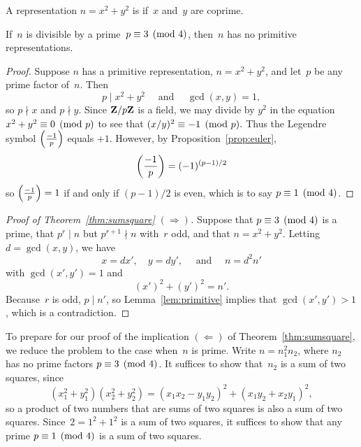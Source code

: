 \begin{definition}[Primitive]
A representation $n=x^2 + y^2$ is 
if~$x$ and~$y$ are coprime.
\end{definition}

\begin{lemma}\label{lem:primitive}
If~$n$ is divisible by a prime~$p\equiv 3\pmod{4}$, then~$n$
has no primitive representations.
\end{lemma}
\begin{proof}
Suppose $n$ has a primitive representation, $n=x^2 + y^2$, and
let~$p$ be any prime factor of~$n$.  Then
$$
   p \mid x^2 + y^2\quad \text{ and }\quad \gcd(x,y)=1,
$$
so $p\nmid x$ and $p\nmid y$.
Since $\mathbf{Z}/p\mathbf{Z}{}$ is a field, we may divide by $y^2$ in the equation
$x^2 + y^2 \equiv 0\pmod{p}$ to see that
$
  (x/y)^2 \equiv -1\pmod{p}.
$
Thus the Legendre symbol $\left(\frac{-1}{p}\right)$ equals $+1$.
However, by Proposition~\ref{prop:euler},
$$
   \left(\frac{-1}{p}\right) = (-1)^{(p-1)/2}
$$
so $\left(\frac{-1}{p}\right)=1$ if and only if $(p-1)/2$ is even, which is
to say $p\equiv 1\pmod{4}$.
\end{proof}

\begin{proof}[Proof of Theorem~\ref{thm:sumsquare}
  $\left(\Longrightarrow\right)$]
  Suppose that $p\equiv 3\pmod{4}$ is a prime, that
  $p^r\mid n$ but $p^{r+1}\nmid n$ with~$r$ odd, and that
  $n=x^2+y^2$.  Letting $d=\gcd(x,y)$, we have
  $$
  x = dx', \quad y = dy', \quad\text{ and }\quad n = d^2 n'
  $$
  with $\gcd(x',y')=1$ and
  $$
  (x')^2 + (y')^2 = n'.
  $$
  Because~$r$ is odd, $p\mid n'$, so Lemma~\ref{lem:primitive}
  implies that $\gcd(x',y')>1$, which is a contradiction.
\end{proof}

To prepare for our proof of the implication
$\left(\Longleftarrow\right)$ of Theorem~\ref{thm:sumsquare}, we
reduce the problem to the case when~$n$ is prime.  Write $n=n_1^2 n_2$,
where $n_2$ has no prime factors $p\equiv 3\pmod{4}$.  It suffices to
show that~$n_2$ is a sum of two squares, since
\begin{equation}\label{eqn:ssnormprod}
  (x_1^2 + y_1^2)(x_2^2+y_2^2) = (x_1x_2-y_1y_2)^2 + (x_1y_2+x_2y_1)^2,
\end{equation}
so a product of two numbers that are sums of two squares is also
a sum of two squares.
Since~$2=1^2+1^2$ is a sum of two squares, it suffices to show
that any prime $p\equiv 1\pmod{4}$ is a sum of two squares.

